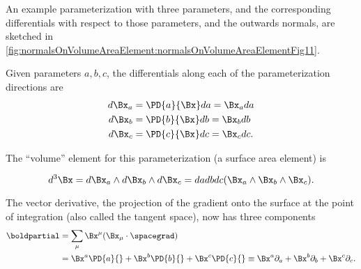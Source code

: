 %
%
An example parameterization with three parameters, and the corresponding differentials with respect to those parameters, and the outwards normals, are sketched in
\cref{fig:normalsOnVolumeAreaElement:normalsOnVolumeAreaElementFig11}.

Given parameters \( a, b, c \), the differentials along each of the parameterization directions are
\begin{equation}\label{eqn:stokesTheoremCore:1421}
\begin{aligned}
d\Bx_a &= \PD{a}{\Bx} da = \Bx_a da \\
d\Bx_b &= \PD{b}{\Bx} db = \Bx_b db \\
d\Bx_c &= \PD{c}{\Bx} dc = \Bx_c dc.
\end{aligned}
\end{equation}

The ``volume'' element for this parameterization (a surface area element) is

\begin{equation}\label{eqn:stokesTheoremCore:1441}
d^3 \Bx
=
d\Bx_a
\wedge
d\Bx_b
\wedge
d\Bx_c
=
da db dc (\Bx_a \wedge \Bx_b \wedge \Bx_c).
\end{equation}

The vector derivative, the projection of the gradient onto the surface at the point of integration (also called the tangent space), now has three components
\begin{equation}\label{eqn:stokesTheoremCore:1461}
\begin{aligned}
\boldpartial
&= \sum_\mu \Bx^\mu (\Bx_\mu \cdot \spacegrad) \\
&=
\Bx^a \PD{a}{}
+
\Bx^b \PD{b}{}
+
\Bx^c \PD{c}{}
\equiv
\Bx^a \partial_a
+
\Bx^b \partial_b
+
\Bx^c \partial_c.
\end{aligned}
\end{equation}


